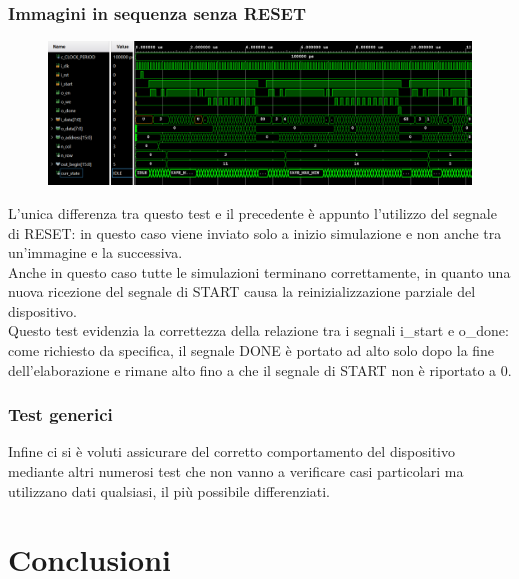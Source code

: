 \documentclass[a4paper, 12pt]{article}
\begin{document}
\subsubsection{Immagini in sequenza senza RESET}
\begin{figure}[h]
    \centering
    \includegraphics[trim=0cm 1.25cm 0cm 0.25cm, width=1.0\textwidth]{simulazioni/GEN_NO_RESET.png}
    \label{fig:gen_no_reset}
\end{figure}
L'unica differenza tra questo test e il precedente è appunto l'utilizzo del segnale di  RESET: in questo caso viene inviato solo a inizio simulazione e non anche tra un'immagine e la successiva. \\
Anche in questo caso tutte le simulazioni terminano correttamente, in quanto una nuova ricezione del segnale di START causa la reinizializzazione parziale del dispositivo. \\
Questo test evidenzia la correttezza della relazione tra i segnali i\_start e o\_done: come richiesto da specifica, il segnale DONE è portato ad alto solo dopo la fine dell'elaborazione e rimane alto fino a che il segnale di START non è riportato a 0.

\subsubsection{Test generici}
Infine ci si è voluti assicurare del corretto comportamento del dispositivo mediante altri numerosi test che non vanno a verificare casi particolari ma utilizzano dati qualsiasi, il più possibile differenziati.


\newpage
\section{Conclusioni}
\end{document}
